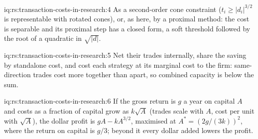 \begin{solution}{iq:rs:transaction-costs-in-research:4}
As a second-order cone constraint ($t_i \ge \lvert d_i\rvert^{3/2}$ is representable with rotated cones), or, as here, by a proximal method: the cost is separable and
its proximal step has a closed form, a soft threshold followed by the root of a quadratic in $\sqrt{\lvert d\rvert}$.
\end{solution}

\begin{solution}{iq:rs:transaction-costs-in-research:5}
Net their trades internally, share the saving by standalone cost, and cost each strategy at its marginal cost to the firm: same-direction trades cost more
together than apart, so combined capacity is below the sum.
\end{solution}

\begin{solution}{iq:rs:transaction-costs-in-research:6}
If the gross return is $g$ a year on capital $A$ and costs as a fraction of capital grow as $k\sqrt A$ (trades scale with $A$, cost per unit with $\sqrt A$), the dollar
profit is $gA - kA^{3/2}$, maximised at $A^* = (2g/(3k))^2$, where the return on capital is $g/3$; beyond it every dollar added lowers the profit.
\end{solution}
